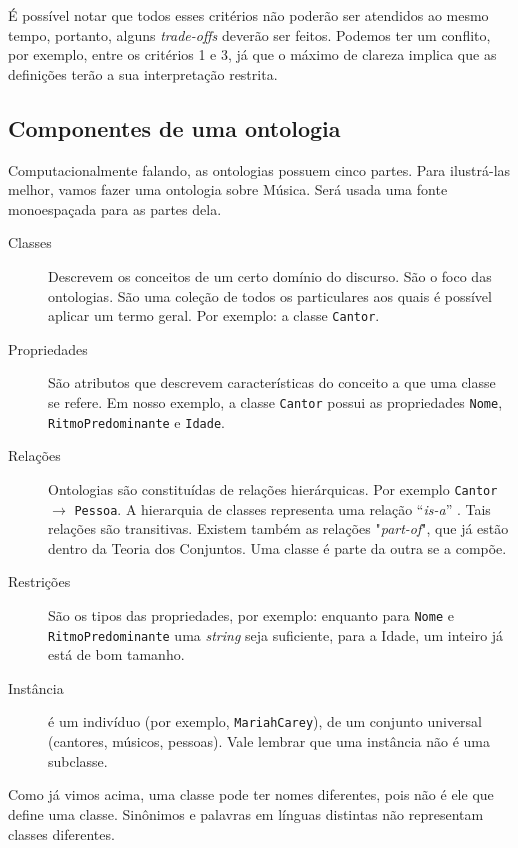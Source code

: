 É possível notar que todos esses critérios não poderão ser atendidos ao mesmo tempo, portanto, alguns \textit{trade-offs} deverão ser feitos.
Podemos ter um conflito, por exemplo, entre os critérios 1 e 3, já que o máximo de clareza implica que as definições terão a sua interpretação restrita.

\subsection{Componentes de uma ontologia}

Computacionalmente falando, as ontologias possuem cinco partes. Para ilustrá-las melhor, vamos fazer uma ontologia sobre Música. Será usada uma fonte monoespaçada para as partes dela.

\begin{description}
	\item[Classes] Descrevem os conceitos de um certo domínio do discurso. São o foco das ontologias. São uma coleção de todos os particulares aos quais é possível aplicar um termo geral. Por exemplo: a classe \texttt{Cantor}.
	\item[Propriedades] São atributos que descrevem características do conceito a que uma classe se refere. Em nosso exemplo, a classe \texttt{Cantor} possui as propriedades \texttt{Nome}, \\ \texttt{RitmoPredominante} e \texttt{Idade}.
	\item[Relações] Ontologias são constituídas de relações hierárquicas. Por exemplo \texttt{Cantor} $ \to $ \texttt{Pessoa}. A hierarquia de classes representa uma relação “\textit{is-a}” \citep{ontoFranca}. Tais relações são transitivas. Existem também as relações "\textit{part-of}", que já estão dentro da Teoria dos Conjuntos. Uma classe é parte da outra se a compõe.
	\item[Restrições] São os tipos das propriedades, por exemplo: enquanto para \texttt{Nome} e \\ \texttt{RitmoPredominante} uma \textit{string} seja suficiente, para a Idade, um inteiro já está de bom tamanho.
	\item[Instância] é um indivíduo (por exemplo, \texttt{MariahCarey}), de um conjunto universal (cantores, músicos, pessoas). Vale lembrar que uma instância não é uma subclasse.
\end{description}

Como já vimos acima, uma classe pode ter nomes diferentes, pois não é ele que define uma classe. Sinônimos e palavras em línguas distintas não representam classes diferentes.

